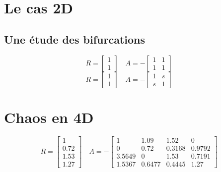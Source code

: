 \documentclass{wsdcr}
\begin{document}
\section{Le cas 2D}
\subsection{Une étude des bifurcations}
\begin{equation}
R={\begin{bmatrix}1\\1\end{bmatrix}}\quad A =-{\begin{bmatrix}1&1\\1&1\end{bmatrix}}
\end{equation}
\begin{equation}
R={\begin{bmatrix}1\\1\end{bmatrix}}\quad A =-{\begin{bmatrix}1&s\\s&1\end{bmatrix}}
\end{equation}
\section{Chaos en 4D}
\begin{equation}
R={\begin{bmatrix}1\\0.72\\1.53\\1.27\end{bmatrix}}\quad A =-{\begin{bmatrix}1&1.09&1.52&0\\0&0.72&0.3168&0.9792\\3.5649&0&1.53&0.7191\\1.5367&0.6477&0.4445&1.27\end{bmatrix}}
\end{equation}
\end{document}
